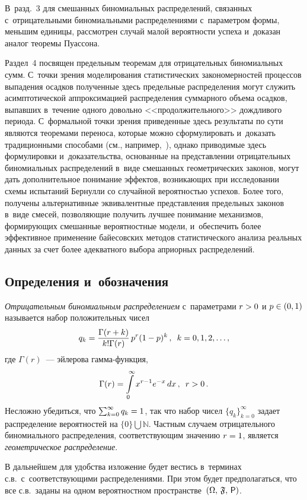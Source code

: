 \begin{multicols}{2}
В~разд.~3 для смешанных биномиальных распределений, связанных 
с~отрицательными биномиальными распределениями с~параметром формы,
меньшим единицы, рассмотрен случай малой вероятности успеха 
и~доказан аналог теоремы Пуассона. 

Раздел~4 посвящен предельным
теоремам для отрицательных биномиальных сумм. С~точки зрения
моделирования статистических закономерностей процессов выпадения
осадков полученные здесь предельные распределения могут служить
асимптотической аппроксимацией распределения суммарного объема
осадков, выпавших в~течение одного довольно <<продолжительного>>
дождливого периода. С~формальной точки зрения приведенные здесь
результаты по сути являются теоремами переноса, которые можно
сформулировать и~доказать традиционными способами (см., 
например,~\cite{GnedenkoKorolev1996}), однако приводимые здесь формулировки 
и~доказательства, основанные на представлении отрицательных
биномиальных распределений в~виде смешанных геометрических законов,
могут дать дополнительное\linebreak
 понимание эффектов, возникающих при
исследовании схемы испытаний Бернулли со случайной вероят\-ностью
успехов. Более того, получены альтернативные эквивалентные
представления предельных законов в~виде смесей, позволяющие получить
лучшее понимание механизмов, фор\-ми\-ру\-ющих смешанные вероятностные
модели, и~обеспечить более эффективное применение байесовских
методов статистического анализа реальных данных за счет более
адекватного выбора априорных распределений.

\subsection{Определения и~обозначения}


\textit{Отрицательным биномиальным распределением} с~параметрами $r\hm>0$
и $p\hm\in(0,1)$ называется набор положительных чисел
$$
q_k=\displaystyle\frac{\displaystyle \Gamma(r+k)\mathstrut}{\displaystyle k!\Gamma(r)\mathstrut}\, p^r(1-p)^k\,,\enskip
k=0,1,2,\ldots,
$$
где $\Gamma(r)$~--- эйлерова гам\-ма-функ\-ция,
$$
\Gamma(r)=\int\limits_{0}^{\infty}x^{r-1}e^{-x}\,dx\,,\enskip r>0\,.
$$
Несложно убедиться, что $\sum_{k=0}^{\infty}q_k\hm=1$, так что набор
чисел $\{q_k\}_{k=0}^{\infty}$ задает распределение вероятностей на
$\{0\}\bigcup\mathbb{N}$. Частным случаем отрицательного
биномиального распределения, соответствующим значению $r\hm=1$,
является {\it геометрическое распределение}.

В дальнейшем для удобства изложение будет вестись в~терминах с.в.\ 
с~соответствующими распределениями. При этом будет предполагаться, что
все с.в.\ заданы на одном вероятностном пространстве~$(\Omega,\,\mathfrak{F},\,{\sf P})$.


\end{multicols}
